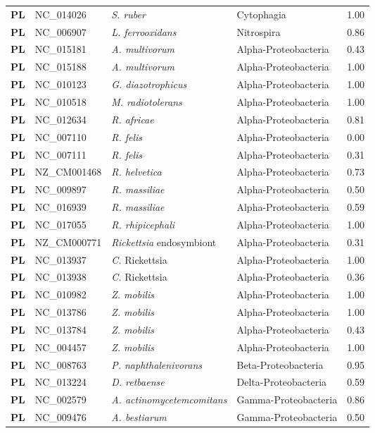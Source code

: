 \begin{adjustwidth}{-3cm}{2cm}
{\begin{supertabular}{>{\bfseries}l|p{0.1\textwidth}p{0.14\textwidth}l|l}
PL & NC\_014026 & \textit{S. ruber} & Cytophagia & 1.00\\
PL & NC\_006907 & \textit{L. ferrooxidans} & Nitrospira & 0.86\\
PL & NC\_015181 & \textit{A. multivorum} & Alpha-Proteobacteria & 0.43\\
PL & NC\_015188 & \textit{A. multivorum} & Alpha-Proteobacteria & 1.00\\
PL & NC\_010123 & \textit{G. diazotrophicus} & Alpha-Proteobacteria & 1.00\\
PL & NC\_010518 & \textit{M. radiotolerans} & Alpha-Proteobacteria & 1.00\\
PL & NC\_012634 & \textit{R. africae} & Alpha-Proteobacteria & 0.81\\
PL & NC\_007110 & \textit{R. felis} & Alpha-Proteobacteria & 0.00\\
PL & NC\_007111 & \textit{R. felis} & Alpha-Proteobacteria & 0.31\\
PL & NZ\_CM001468 & \textit{R. helvetica} & Alpha-Proteobacteria & 0.73\\
PL & NC\_009897 & \textit{R. massiliae} & Alpha-Proteobacteria & 0.50\\
PL & NC\_016939 & \textit{R. massiliae} & Alpha-Proteobacteria & 0.59\\
PL & NC\_017055 & \textit{R. rhipicephali} & Alpha-Proteobacteria & 1.00\\
PL & NZ\_CM000771 & \textit{Rickettsia} endosymbiont & Alpha-Proteobacteria & 0.31\\
PL & NC\_013937 & \textit{C.} Rickettsia & Alpha-Proteobacteria & 1.00\\
PL & NC\_013938 & \textit{C.} Rickettsia & Alpha-Proteobacteria & 0.36\\
PL & NC\_010982 & \textit{Z. mobilis} & Alpha-Proteobacteria & 1.00\\
PL & NC\_013786 & \textit{Z. mobilis} & Alpha-Proteobacteria & 1.00\\
PL & NC\_013784 & \textit{Z. mobilis} & Alpha-Proteobacteria & 0.43\\
PL & NC\_004457 & \textit{Z. mobilis} & Alpha-Proteobacteria & 1.00\\
PL & NC\_008763 & \textit{P. naphthalenivorans} & Beta-Proteobacteria & 0.95\\
PL & NC\_013224 & \textit{D. retbaense} & Delta-Proteobacteria & 0.59\\
PL & NC\_002579 & \textit{A. actinomycetemcomitans} & Gamma-Proteobacteria & 0.86\\
PL & NC\_009476 & \textit{A. bestiarum} & Gamma-Proteobacteria & 0.50\\

\end{supertabular}}
\end{adjustwidth}
